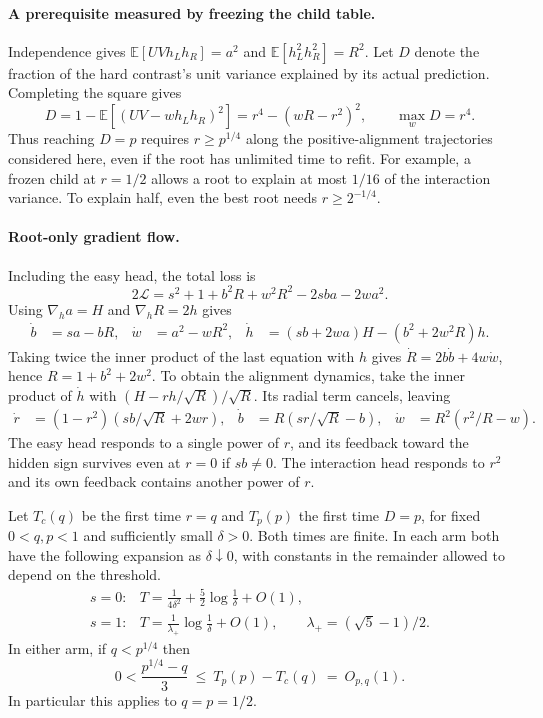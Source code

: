 \paragraph{A prerequisite measured by freezing the child table.}
Independence gives $\mathbb E[UVh_Lh_R]=a^2$ and
$\mathbb E[h_L^2h_R^2]=R^2$. Let $D$ denote the fraction of the hard
contrast's unit variance explained by its actual prediction. Completing
the square gives
\begin{equation}
 D=1-\mathbb E[(UV-wh_Lh_R)^2]
  =r^4-(wR-r^2)^2,\qquad \max_w D=r^4 .
 \label{eq:toy-risk}
\end{equation}
Thus reaching $D=p$ requires $r\ge p^{1/4}$ along the positive-alignment
trajectories considered here, even if the root has unlimited time to
refit. For example, a frozen child at $r=1/2$ allows a root to explain
at most $1/16$ of the interaction variance. To explain half, even the
best root needs $r\ge 2^{-1/4}$.

\paragraph{Root-only gradient flow.}
Including the easy head, the total loss is
\begin{equation}
 2\mathcal L=s^2+1+b^2R+w^2R^2-2sba-2wa^2 .
 \label{eq:toy-objective}
\end{equation}
Using $\nabla_h a=H$ and $\nabla_h R=2h$ gives
\begin{align}
 \dot b&=sa-bR,& \dot w&=a^2-wR^2,&
 \dot h&=(sb+2wa)H-(b^2+2w^2R)h .
 \label{eq:toy-parameter-flow}
\end{align}
Taking twice the inner product of the last equation with $h$ gives
$\dot R=2b\dot b+4w\dot w$, hence $R=1+b^2+2w^2$.
To obtain the alignment dynamics, take the inner product of $\dot h$
with $(H-rh/\sqrt R)/\sqrt R$. Its radial term cancels, leaving
\begin{align}
 \dot r&=(1-r^2)(sb/\sqrt R+2wr),&
 \dot b&=R(sr/\sqrt R-b),&
 \dot w&=R^2(r^2/R-w).
 \label{eq:toy-reduced}
\end{align}
The easy head responds to a single power of $r$, and its feedback toward
the hidden sign survives even at $r=0$ if $sb\ne0$. The interaction
head responds to $r^2$ and its own feedback contains another power of $r$.

\begin{theorem}
\label{prop:toy-gap}
Let $T_c(q)$ be the first time $r=q$ and $T_p(p)$ the first time $D=p$,
for fixed $0<q,p<1$ and sufficiently small $\delta>0$. Both times are
finite. In each arm both have the following expansion as $\delta\downarrow0$,
with constants in the remainder allowed to depend on the threshold.
\[
\begin{array}{ll}
s=0: & \displaystyle
 T=\frac{1}{4\delta^2}+\frac52\log\frac{1}{\delta}+O(1),\\[5pt]
s=1: & \displaystyle
 T=\frac{1}{\lambda_+}\log\frac{1}{\delta}+O(1),
 \qquad \lambda_+=(\sqrt5-1)/2 .
\end{array}
\]
In either arm, if $q<p^{1/4}$ then
\[
 0<\frac{p^{1/4}-q}{3}\ \le\ T_p(p)-T_c(q)\ =\ O_{p,q}(1).
\]
In particular this applies to $q=p=1/2$.
\end{theorem}


